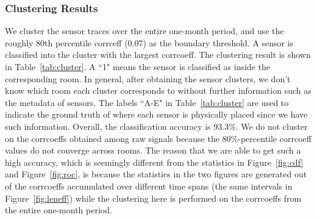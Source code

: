 \subsubsection{Clustering Results}
We cluster the sensor traces over the entire one-month period, and use the roughly 80th percentile corrceff (0.07) as the boundary threshold. 
A sensor is classified into the cluster with the largest corrcoeff. The clustering result is shown in Table~\ref{tab:cluster}.  A ``1" means the sensor is classified as inside the corresponding room. 
In general, after obtaining the sensor clusters, we don't know which room each cluster corresponds to without further information such as the metadata of sensors. The labels ``A-E" in Table~\ref{tab:cluster} are used to indicate the ground truth of where each sensor is physically placed since we have such information. Overall, the classification accuracy 
is 93.3\%.  We do not cluster on the corrcoeffs obtained among raw signals because the 80\%-percentile corrcoeff values do not converge across rooms.
The reason that we are able to get such a high accuracy, which is seemingly different from the statistics in Figure~\ref{fig:cdf} and Figure~\ref{fig:roc}, is because the statistics in the two figures are generated out of the corrcoeffs accumulated over different time spans (the same intervals in Figure~\ref{fig:leneff}) while the clustering here is performed on the corrcoeffs from the entire one-month period. 

